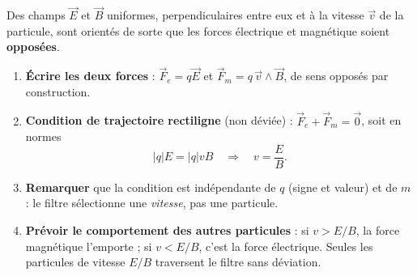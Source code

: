 \documentclass[11pt]{article}
\begin{document}
\begin{methode}
Des champs $\vec{E}$ et $\vec{B}$ uniformes, perpendiculaires entre eux et à la vitesse $\vec{v}$ de la particule, sont orientés de sorte que les forces électrique et magnétique soient \textbf{opposées}.
\begin{enumerate}
\item \textbf{Écrire les deux forces} : $\vec{F}_e=q\vec{E}$ et $\vec{F}_m=q\,\vec{v}\wedge\vec{B}$, de sens opposés par construction.
\item \textbf{Condition de trajectoire rectiligne} (non déviée) : $\vec{F}_e+\vec{F}_m=\vec{0}$, soit en normes
\[ |q|E=|q|vB \quad\Longrightarrow\quad v=\dfrac{E}{B}. \]
\item \textbf{Remarquer} que la condition est indépendante de $q$ (signe et valeur) et de $m$ : le filtre sélectionne une \emph{vitesse}, pas une particule.
\item \textbf{Prévoir le comportement des autres particules} : si $v>E/B$, la force magnétique l'emporte ; si $v<E/B$, c'est la force électrique. Seules les particules de vitesse $E/B$ traversent le filtre sans déviation.
\end{enumerate}
\end{methode}
\end{document}
